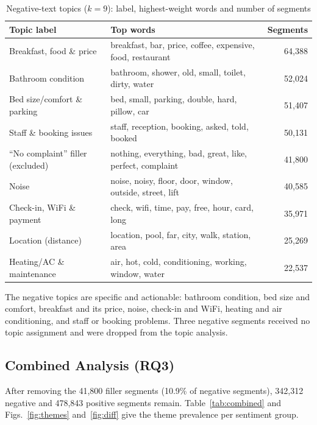 \documentclass[11pt,journal,draftclsnofoot,onecolumn]{IEEEtran}
\begin{document}
\begin{table}[!t]
\caption{Negative-text topics ($k=9$): label, highest-weight words and number of segments}
\label{tab:negtopics}
\centering
\footnotesize
\begin{tabular}{p{4.0cm}p{7.4cm}r}
\toprule
Topic label & Top words & Segments \\
\midrule
Breakfast, food \& price & breakfast, bar, price, coffee, expensive, food, restaurant & 64,388 \\
Bathroom condition & bathroom, shower, old, small, toilet, dirty, water & 52,024 \\
Bed size/comfort \& parking & bed, small, parking, double, hard, pillow, car & 51,407 \\
Staff \& booking issues & staff, reception, booking, asked, told, booked & 50,131 \\
``No complaint'' filler (excluded) & nothing, everything, bad, great, like, perfect, complaint & 41,800 \\
Noise & noise, noisy, floor, door, window, outside, street, lift & 40,585 \\
Check-in, WiFi \& payment & check, wifi, time, pay, free, hour, card, long & 35,971 \\
Location (distance) & location, pool, far, city, walk, station, area & 25,269 \\
Heating/AC \& maintenance & air, hot, cold, conditioning, working, window, water & 22,537 \\
\bottomrule
\end{tabular}
\end{table}

The negative topics are specific and actionable: bathroom condition, bed size and comfort, breakfast and its price, noise, check-in and WiFi, heating and air conditioning, and staff or booking problems. Three negative segments received no topic assignment and were dropped from the topic analysis.

\subsection{Combined Analysis (RQ3)}
After removing the 41,800 filler segments (10.9\% of negative segments), 342,312 negative and 478,843 positive segments remain. Table~\ref{tab:combined} and Figs.~\ref{fig:themes} and~\ref{fig:diff} give the theme prevalence per sentiment group.
\end{document}
